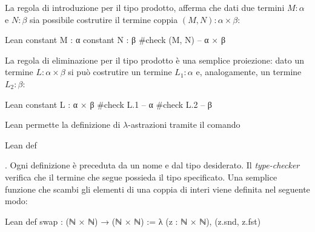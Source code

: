 La regola di introduzione per il tipo prodotto, afferma che dati due termini $M : \alpha$ e $N : \beta$ sia possibile costrutire il termine coppia $( M, N): \alpha \times \beta$:
\begin{code}{Lean}
constant M : α
constant N : β
#check (M, N) -- α × β
\end{code}
La regola di eliminazione per il tipo prodotto è una semplice proiezione: dato un termine $L : \alpha \times \beta$ si può costrutire un termine $L_1 : \alpha$ e, analogamente, un termine $L_2 : \beta$:
\begin{code}{Lean}
constant L : α × β
#check L.1 -- α
#check L.2 -- β 
\end{code}

Lean permette la definizione di $\lambda$-astrazioni tramite il comando \begin{mintinline}{Lean} def \end{mintinline}. Ogni definizione è preceduta da un nome e dal tipo desiderato. Il \emph{type-checker} verifica che il termine che segue possieda il tipo specificato. Una semplice funzione che scambi gli elementi di una coppia di interi viene definita nel seguente modo:
\begin{code}{Lean}
def swap : (ℕ × ℕ) → (ℕ × ℕ) := 
   λ (z : ℕ × ℕ), (z.snd, z.fst)
\end{code}

\begin{comment}
Riprendendo quanto affermato ad inizio capitolo, le proposizioni sono identificate da particolari tipi, per cui l'attività matematica di provare un teorema corrisponde alla costruzione di un particolare oggetto, un $\lambda$-termine, abitante del tipo che rappresenta la proposizione. La valutazione di un programma, o riduzione del $\lambda$-termine, corrisponde alla semplificazione della prova: si consideri un termine che costruisce una coppia di tipo $\alpha \times \beta$ a partire da $a : \alpha$ e $b : \beta$ prima costruendo una coppia di tipo $\beta \times \alpha$ e poi invertendone gli elementi con la funzione definita sopra. La riduzione del termine mostra un modo più semplice per ottenere lo stesso risultato:
\begin{code}{Lean}
constant a : α
constant b : β

#check (λ (z : β × α), (z.snd, z.fst)) (b, a)
-- α × β
#reduce (λ (z : β × α), (z.snd, z.fst)) (b, a)
-- (a, b)
\end{code}

Nel capitolo \ref{tdep} viene mostrata una estensione del sistema di tipo utile a rappresentare i concetti di quantificazione universale ed esistenziale.
\end{comment}

